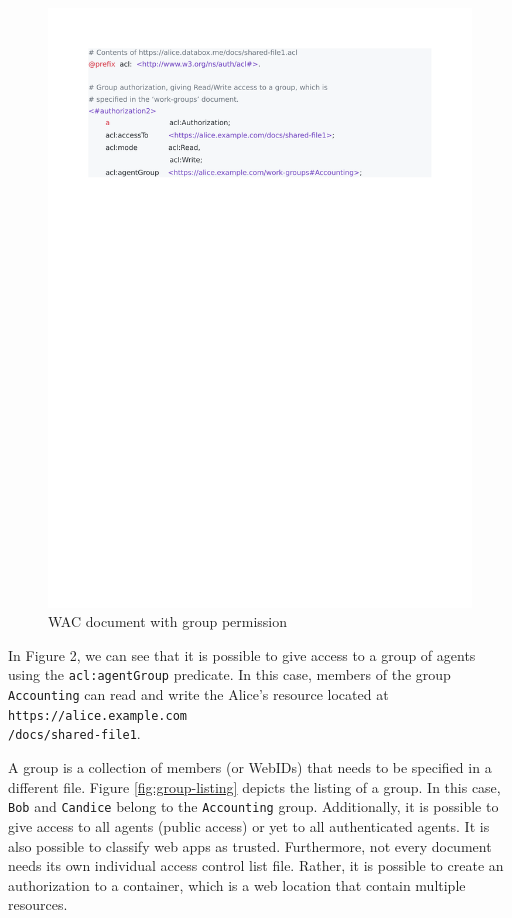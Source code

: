 \documentclass[sigconf]{acmart}
\def\code#1{\texttt{#1}}
\begin{document}
\begin{figure}
  \includegraphics[trim=2cm 21.2cm 4.7cm 2cm, clip, scale=0.57]{pdf/shared-file1}
  \caption{WAC document with group permission}
  \label{fig:group-permission}
\end{figure}

In Figure 2, we can see that it is possible to give access to a group of agents using the \code{acl:agentGroup} predicate. In this case, members of the group \code{Accounting} can read and write the Alice's resource located at \code{https://alice.example.com\\/docs/shared-file1}.

A group is a collection of members (or WebIDs) that needs to be specified in a different file. Figure \ref{fig:group-listing} depicts the listing of a group. In this case, \code{Bob} and \code{Candice} belong to the \code{Accounting} group. Additionally, it is possible to give access to all agents (public access) or yet to all authenticated agents. It is also possible to classify web apps as trusted. Furthermore, not every document needs its own individual access control list file. Rather, it is possible to create an authorization to a container, which is a web location that contain multiple resources.
\end{document}
